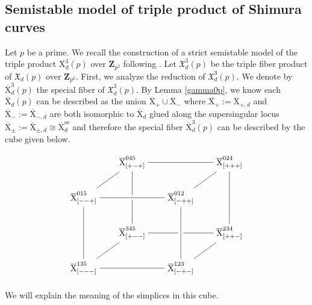 \documentclass[10pt]{amsart}
\newcommand*\Z{\mathds{Z}}
\newcommand*\ZZ{|[draw,circle]| \Z_2}
\numberwithin{equation}{section}
\theoremstyle{plain}
\numberwithin{equation}{section}
\theoremstyle{definition}
\theoremstyle{remark}
\def\ss{\mathrm{ss}}
\def\ZZ{\mathbf{Z}}
\def\rmX{\mathrm{X}}
\def\rmXbar{\overline{\rmX}}
\begin{document}
\subsection{Semistable model of triple product of Shimura curves}
Let $p$ be a prime. We recall the construction of a strict semistable model of the triple product $\rmX^{3}_{d}(p)$  over $\ZZ_{p^{2}}$ following \cite{GS}. 
Let $\mathfrak{X}^{3}_{d}(p)$ be the triple fiber product of $\mathfrak{X}_{d}(p)$ over $\ZZ_{p^{2}}$.  First, we analyze the reduction of  $\mathfrak{X}^{3}_{d}(p)$. We denote by $\overline{\rmX}^{3}_{d}(p)$ the special fiber of  $\mathfrak{X}^{3}_{d}(p)$. By Lemma \ref{gamma0p}, we know each $\overline{\rmX}_{d}(p)$ can be described as the union $\overline{\rmX}_{+}\cup \overline{\rmX}_{-}$ where $\rmXbar_{+}:=\rmXbar_{+,d}$ and $\rmXbar_{-}:=\rmXbar_{-,d}$ are both isomorphic to $\rmXbar_{d}$ glued along the supersingular locus $\rmXbar_{\pm}:=\rmXbar_{\pm,d}\cong \rmXbar^{\ss}_{d}$ and therefore the special fiber $\overline{\rmX}^{3}_{d}(p)$ can be described by the cube given below.
\begin{equation*}
\begin{tikzpicture}
  \matrix (m) [matrix of math nodes, row sep=2em,
    column sep=2em]{
     &  {\rmXbar}^{045}_{[+-+]} & &  {\rmXbar}^{024}_{[+++]}\\
         {\rmXbar}^{015}_{[--+]}& &    {\rmXbar}^{012}_{[-++]} & \\
    &  {\rmXbar}^{345}_{[+--]}& &  {\rmXbar}^{234}_{[++-]} \\
        {\rmXbar}^{135}_{[---]} & &     {\rmXbar}^{123}_{[-+-]} & \\}  ;
     \path
    (m-1-2) edge (m-1-4) edge (m-2-1) edge (m-3-2) 
    (m-1-4) edge (m-3-4) edge (m-2-3) 
    (m-2-1) edge [-,line width=6pt,draw=white] (m-2-3) edge (m-2-3) edge (m-4-1) 
    (m-3-2) edge  (m-3-4) edge (m-4-1) 
    (m-4-1) edge (m-4-3) 
    (m-3-4) edge (m-4-3) 
    (m-2-3) edge [-,line width=6pt,draw=white] (m-4-3) edge (m-4-3) ;
\end{tikzpicture}
\end{equation*}
We will explain the meaning of the simplices in this cube.
\end{document}
